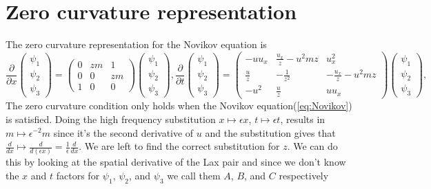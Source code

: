 \documentclass[english,master]{liumaiex}
\theoremstyle{plain}
\theoremstyle{definition}
\begin{document}
\section{Zero curvature representation}

The zero curvature representation for the Novikov equation \cite{Lundmark_2022} is
\begin{subequations}
  \label{eq:Novikov-lax}
  \begin{equation}
    \label{eq:Novikov-lax-x}
    \frac{\partial}{\partial x}
    \begin{pmatrix} \psi_1 \\ \psi_2 \\ \psi_3 \end{pmatrix} =
    \begin{pmatrix}
      0 & zm & 1 \\
      0 & 0 & zm \\
      1 & 0 & 0
    \end{pmatrix}
    \begin{pmatrix} \psi_1 \\ \psi_2 \\ \psi_3 \end{pmatrix}
    ,
  \end{equation}
  \begin{equation}
    \label{eq:Novikov-lax-t}
    \frac{\partial}{\partial t}
    \begin{pmatrix} \psi_1 \\ \psi_2 \\ \psi_3 \end{pmatrix} =
    \begin{pmatrix}
      -u u_x & \frac{u_x}{z}-u^2 mz & u_x^2 \\
      \frac{u}{z} & - \frac{1}{z^2} & - \frac{u_x}{z} - u^2 mz \\
      -u^2 & \frac{u}{z} & uu_x
    \end{pmatrix}
    \begin{pmatrix} \psi_1 \\ \psi_2 \\ \psi_3 \end{pmatrix}
    ,
  \end{equation}
\end{subequations}
%
The zero curvature condition only holds when the Novikov equation(\ref{eq:Novikov}) is satisfied.
Doing the high frequency substitution $x \mapsto \epsilon x$, $t \mapsto \epsilon t$, results in $m \mapsto \epsilon^{-2} m$ since it's the second derivative of $u$ and the substitution gives that $\frac{d}{dx} \mapsto \frac{d}{d (\epsilon x)} = \frac{1}{\epsilon} \frac{d}{dx}$. We are left to find the correct substitution for $z$. We can do this by looking at the spatial derivative of the Lax pair and since we don't know the $x$ and $t$ factors for $\psi_1$, $\psi_2$, and $\psi_3$ we call them $A$, $B$, and $C$ respectively
\end{document}
